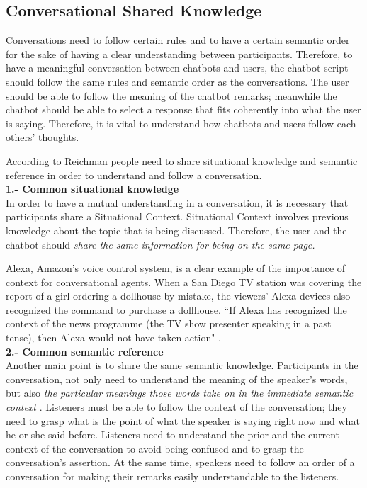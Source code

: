 \documentclass[a4paper,10pt]{article}
\begin{document}
\subsection*{Conversational Shared Knowledge}

Conversations need to follow certain rules and to have a certain semantic order for the sake of having a clear understanding between participants. Therefore, to have a meaningful conversation between chatbots and users, the chatbot script should follow the same rules and semantic order as the conversations. The user should be able to follow the meaning of the chatbot remarks; meanwhile the chatbot should be able to select a response that fits coherently into what the user is saying. Therefore, it is vital to understand how chatbots and users follow each others' thoughts.

According to Reichman \cite{reichman1985getting} people need to share situational knowledge and semantic reference in order to understand and follow a conversation.\\[0\baselineskip]

\textbf{1.-  Common situational knowledge}\\[0\baselineskip]
In order to have a mutual understanding in a conversation, it is necessary that participants share a Situational Context. Situational Context involves previous knowledge about the topic that is being discussed.  Therefore, the user and the chatbot should \textit{share the same information for being on the same page.} 

Alexa, Amazon's voice control system, is a clear example of the importance of context for conversational agents. When  a San Diego TV station was covering the report of a girl ordering a dollhouse by mistake, the viewers' Alexa devices also recognized the command to purchase a dollhouse. ``If Alexa has recognized the context of the news programme (the TV show presenter speaking in a past tense), then Alexa would not have taken action" \cite{WhatwecanlearnfromAlexasmistakes}.\\[0\baselineskip]

\textbf{2.-  Common semantic reference} \\[0\baselineskip]
Another main point is to share the same semantic knowledge. Participants in the conversation, not only need to understand the meaning of the speaker's words, but also \textit{the particular meanings those words take on in the immediate semantic context} \cite{reichman1985getting}. 
Listeners must be able to follow the context of the conversation; they need to grasp what is the point of what the speaker is saying right now and what he or she said before. Listeners need to understand the prior and the current context of the conversation to avoid being confused and to grasp the conversation's assertion. At the same time, speakers need to follow an order of a conversation for making their remarks easily understandable to the listeners.
\end{document}
